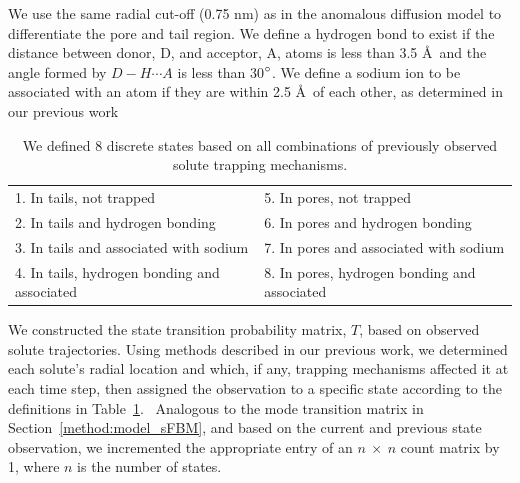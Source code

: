 \documentclass{article}
\begin{document}
  

  We use the same radial cut-off (0.75 nm) as in the 
  anomalous diffusion model to differentiate the pore and tail region.  We define 
  a hydrogen bond to exist if the distance between donor, D, and acceptor, A, 
  atoms is less than 3.5 \AA~and the angle formed by $D-H \cdots A$ is less than
  30$\degree$. We define a sodium ion to be associated with an atom if they are 
  within 2.5 \AA~of each other, 
  as determined in our previous work~\cite{coscia_chemically_2019}
  
  \begin{table}[!htb]
	  \centering
	  \begin{tabular}{|l|l|}
	  \hline
	  1. In tails, not trapped                     & 5. In pores, not trapped                     \\
	  2. In tails and hydrogen bonding             & 6. In pores and hydrogen bonding             \\
	  3. In tails and associated with sodium       & 7. In pores and associated with sodium       \\
	  4. In tails, hydrogen bonding and associated & 8. In pores, hydrogen bonding and associated \\
	  \hline
	  \end{tabular}
	  \caption{We defined 8 discrete states based on all combinations of previously observed solute
	  trapping mechanisms.}\label{table:states}  
  \end{table}
  
  We constructed the state transition probability matrix, $T$, based on observed solute trajectories.
  Using methods described in our previous work, we determined each solute's radial location 
  and which, if any, trapping mechanisms affected it at each time step, then assigned the 
  observation to a specific state according to the definitions in Table~\ref{table:states}.~\cite{coscia_chemically_2019}
  Analogous to the mode transition matrix in Section~\ref{method:model_sFBM}, and based on
  the current and previous state observation, we incremented the appropriate entry of an
  $n~\times~n$ count matrix by 1, where $n$ is the number of states.
  
\end{document}
